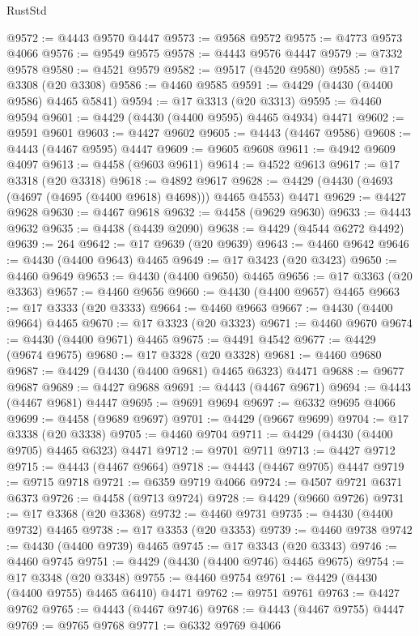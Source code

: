 \begin{lexlean}{RustStd}
\begin{coremodule}
@9572 := @4443 @9570 @4447
@9573 := @9568 @9572
@9575 := @4773 @9573 @4066
@9576 := @9549 @9575
@9578 := @4443 @9576 @4447
@9579 := @7332 @9578
@9580 := @4521 @9579
@9582 := @9517 (@4520 @9580)
@9585 := @17 @3308 (@20 @3308)
@9586 := @4460 @9585
@9591 := @4429 (@4430 (@4400 @9586) @4465 @5841)
@9594 := @17 @3313 (@20 @3313)
@9595 := @4460 @9594
@9601 := @4429 (@4430 (@4400 @9595) @4465 @4934) @4471
@9602 := @9591 @9601
@9603 := @4427 @9602
@9605 := @4443 (@4467 @9586)
@9608 := @4443 (@4467 @9595) @4447
@9609 := @9605 @9608
@9611 := @4942 @9609 @4097
@9613 := @4458 (@9603 @9611)
@9614 := @4522 @9613
@9617 := @17 @3318 (@20 @3318)
@9618 := @4892 @9617
@9628 := @4429 (@4430 (@4693 (@4697 (@4695 (@4400 @9618) @4698))) @4465 @4553) @4471
@9629 := @4427 @9628
@9630 := @4467 @9618
@9632 := @4458 (@9629 @9630)
@9633 := @4443 @9632
@9635 := @4438 (@4439 @2090)
@9638 := @4429 (@4544 @6272 @4492)
@9639 := 264
@9642 := @17 @9639 (@20 @9639)
@9643 := @4460 @9642
@9646 := @4430 (@4400 @9643) @4465
@9649 := @17 @3423 (@20 @3423)
@9650 := @4460 @9649
@9653 := @4430 (@4400 @9650) @4465
@9656 := @17 @3363 (@20 @3363)
@9657 := @4460 @9656
@9660 := @4430 (@4400 @9657) @4465
@9663 := @17 @3333 (@20 @3333)
@9664 := @4460 @9663
@9667 := @4430 (@4400 @9664) @4465
@9670 := @17 @3323 (@20 @3323)
@9671 := @4460 @9670
@9674 := @4430 (@4400 @9671) @4465
@9675 := @4491 @4542
@9677 := @4429 (@9674 @9675)
@9680 := @17 @3328 (@20 @3328)
@9681 := @4460 @9680
@9687 := @4429 (@4430 (@4400 @9681) @4465 @6323) @4471
@9688 := @9677 @9687
@9689 := @4427 @9688
@9691 := @4443 (@4467 @9671)
@9694 := @4443 (@4467 @9681) @4447
@9695 := @9691 @9694
@9697 := @6332 @9695 @4066
@9699 := @4458 (@9689 @9697)
@9701 := @4429 (@9667 @9699)
@9704 := @17 @3338 (@20 @3338)
@9705 := @4460 @9704
@9711 := @4429 (@4430 (@4400 @9705) @4465 @6323) @4471
@9712 := @9701 @9711
@9713 := @4427 @9712
@9715 := @4443 (@4467 @9664)
@9718 := @4443 (@4467 @9705) @4447
@9719 := @9715 @9718
@9721 := @6359 @9719 @4066
@9724 := @4507 @9721 @6371 @6373
@9726 := @4458 (@9713 @9724)
@9728 := @4429 (@9660 @9726)
@9731 := @17 @3368 (@20 @3368)
@9732 := @4460 @9731
@9735 := @4430 (@4400 @9732) @4465
@9738 := @17 @3353 (@20 @3353)
@9739 := @4460 @9738
@9742 := @4430 (@4400 @9739) @4465
@9745 := @17 @3343 (@20 @3343)
@9746 := @4460 @9745
@9751 := @4429 (@4430 (@4400 @9746) @4465 @9675)
@9754 := @17 @3348 (@20 @3348)
@9755 := @4460 @9754
@9761 := @4429 (@4430 (@4400 @9755) @4465 @6410) @4471
@9762 := @9751 @9761
@9763 := @4427 @9762
@9765 := @4443 (@4467 @9746)
@9768 := @4443 (@4467 @9755) @4447
@9769 := @9765 @9768
@9771 := @6332 @9769 @4066

\end{coremodule}
\end{lexlean}
